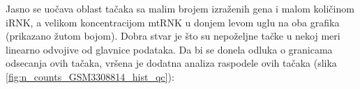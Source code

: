 \documentclass{article}
\begin{document}
Jasno se uočava oblast tačaka sa malim brojem izraženih gena i malom količinom iRNK, a velikom koncentracijom mtRNK u donjem levom uglu na oba grafika (prikazano žutom bojom). Dobra stvar je što su nepoželjne tačke u nekoj meri linearno odvojive od glavnice podataka. Da bi se donela odluka o granicama odsecanja ovih tačaka, vršena je dodatna analiza raspodele ovih tačaka (slika \ref{fig:n_counts_GSM3308814_hist_qc}):

\begin{figure}[!h]
    \centering

\end{figure}
\end{document}
